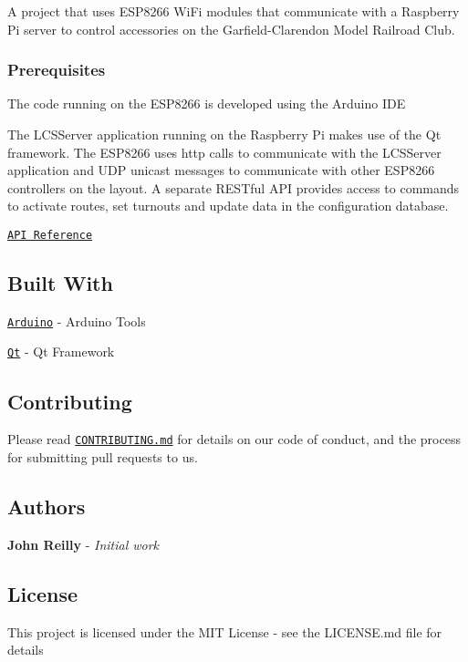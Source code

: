 A project that uses E\+S\+P8266 Wi\+Fi modules that communicate with a Raspberry Pi server to control accessories on the Garfield-\/\+Clarendon Model Railroad Club.

\subsubsection*{Prerequisites}

The code running on the E\+S\+P8266 is developed using the Arduino I\+DE

The L\+C\+S\+Server application running on the Raspberry Pi makes use of the Qt framework. The E\+S\+P8266 uses http calls to communicate with the L\+C\+S\+Server application and U\+DP unicast messages to communicate with other E\+S\+P8266 controllers on the layout. A separate R\+E\+S\+Tful A\+PI provides access to commands to activate routes, set turnouts and update data in the configuration database.

\href{https://github.com/garfieldclarendon/ardunio/api/index.html}{\tt A\+PI Reference}

\subsection*{Built With}


\begin{DoxyItemize}
\item \href{https://www.arduino.cc/en/Main/Software}{\tt Arduino} -\/ Arduino Tools
\item \href{https://www.qt.io/}{\tt Qt} -\/ Qt Framework
\end{DoxyItemize}

\subsection*{Contributing}

Please read \href{https://gist.github.com/PurpleBooth/b24679402957c63ec426}{\tt C\+O\+N\+T\+R\+I\+B\+U\+T\+I\+N\+G.\+md} for details on our code of conduct, and the process for submitting pull requests to us.

\subsection*{Authors}


\begin{DoxyItemize}
\item {\bfseries John Reilly} -\/ {\itshape Initial work}
\end{DoxyItemize}

\subsection*{License}

This project is licensed under the M\+IT License -\/ see the L\+I\+C\+E\+N\+SE.md file for details 